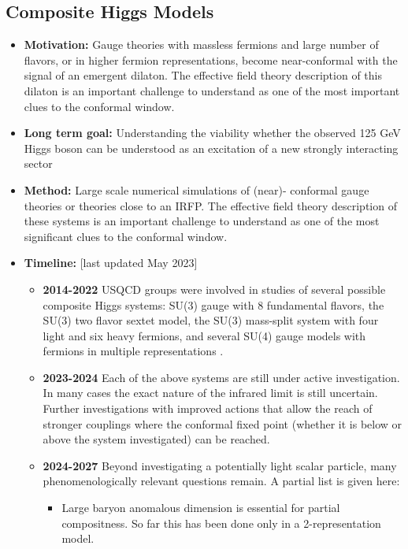 \documentclass[12pt,hyperpdf]{article}
\begin{document}
\subsection{Composite Higgs Models}



\begin{itemize}
\item{ \bf Motivation:} Gauge theories with massless fermions and large
  number of flavors, or in higher fermion representations, become
  near-conformal with the signal of an emergent dilaton. The effective
  field theory description of this dilaton is an important challenge
  to understand as one of the most important clues to the conformal
  window. 
  \item { \bf Long term goal:} Understanding the viability whether the
     observed 125 GeV Higgs boson can be understood as an excitation of
     a new strongly interacting sector
\item {\bf Method:} Large scale numerical simulations of (near)-
     conformal gauge theories or theories close to an IRFP.  
     The effective field theory description of these systems 
     is an important challenge to understand as one of the most
    significant clues to the conformal window. 
\item{\bf Timeline:} \hfill [last updated May 2023]
\begin{itemize}
   \item{\bf 2014-2022} USQCD groups were involved in studies of several possible composite Higgs systems: SU(3) gauge with 8 fundamental flavors, the SU(3) two flavor sextet model, the SU(3)  mass-split system with four light and six heavy fermions, and several SU(4) gauge models with fermions in multiple representations \cite{Fodor:2020niv,LatticeStrongDynamics:2020uwo,Hasenfratz:2023sqa,LSD:2023uzj}. 
   \item{\bf 2023-2024} Each of the above systems are still under active investigation. In many cases the exact nature of the infrared limit is still uncertain. Further investigations with improved actions that allow the reach of stronger couplings where the conformal fixed point (whether it is below or above the system investigated) can be reached.
   \item{\bf 2024-2027} Beyond investigating a potentially light scalar particle, many phenomenologically relevant questions remain. A partial list is given here:
   \begin{itemize}
       \item Large baryon anomalous dimension is essential for partial compositness. So far this has been done  only in a 2-representation model. \cite{Hasenfratz:2023sqa}

\end{itemize}
\end{itemize}
\end{itemize}
\end{document}
